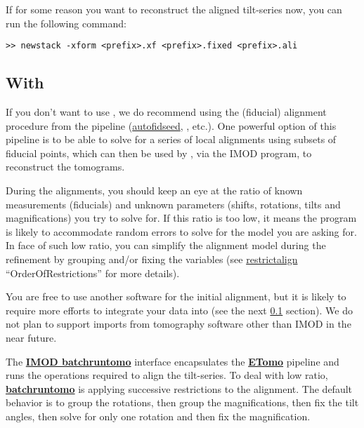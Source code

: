 If for some reason you want to reconstruct the aligned tilt-series now, you can run the following command:
\begin{lstlisting}
>> newstack -xform <prefix>.xf <prefix>.fixed <prefix>.ali
\end{lstlisting}


\subsection{With {\ETomo}} \label{sec:tilt_series_alignment:ETomo}

If you don't want to use , we do recommend using the (fiducial) alignment procedure from the {\ETomo} pipeline (\href{https://bio3d.colorado.edu/imod/doc/man/autofidseed.html}{autofidseed}, {\tiltalign}, etc.). One powerful option of this pipeline is to be able to solve for a series of local alignments using subsets of fiducial points, which can then be used by {\emClarity}, via the IMOD {\tilt} program, to reconstruct the tomograms.

During the alignments, you should keep an eye at the ratio of known measurements (fiducials) and unknown parameters (shifts, rotations, tilts and magnifications) you try to solve for. If this ratio is too low, it means the program is likely to accommodate random errors to solve for the model you are asking for. In face of such low ratio, you can simplify the alignment model during the refinement by grouping and/or fixing the variables (see \href{https://bio3d.colorado.edu/imod/doc/man/restrictalign.html}{restrictalign} ``OrderOfRestrictions'' for more details).

You are free to use another software for the initial alignment, but it is likely to require more efforts to integrate your data into {\emClarity} (see the next \ref{sec:tilt_series_alignment:ETomo} section). We do not plan to support imports from tomography software other than IMOD in the near future.

\begin{note}The \href{https://bio3d.colorado.edu/imod/betaDoc/man/batchruntomo.html}{\textbf{IMOD batchruntomo}} interface encapsulates the \href{https://bio3d.colorado.edu/imod/doc/etomoTutorial.html}{\textbf{ETomo}} pipeline and runs the operations required to align the tilt-series. To deal with low ratio, \href{https://bio3d.colorado.edu/imod/betaDoc/man/batchruntomo.html}{\textbf{batchruntomo}} is applying successive restrictions to the alignment. The default behavior is to group the rotations, then group the magnifications, then fix the tilt angles, then solve for only one rotation and then fix the magnification.
\end{note}

